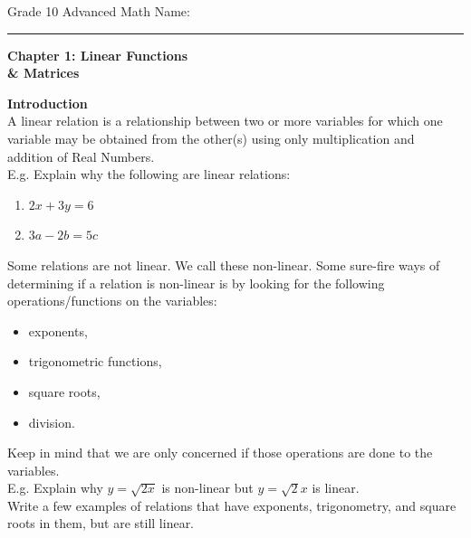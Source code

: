 \documentclass[12pt,fleqn]{book}
\begin{document}
\noindent
\thispagestyle{empty}
Grade 10 Advanced Math \hfill Name: \hspace{2in}
\medskip\hrule
\noindent

\vfill

\begin{center}
	{\bf \huge Chapter 1: Linear Functions \\ \& Matrices}
\end{center}

\vfill
\vfill

\clearpage

\setcounter{page}{1}

{\bf \huge Introduction }
\\[2em]
A linear relation is a relationship between two or more variables for which one variable may be obtained from the other(s) using only multiplication and addition of Real Numbers.
\\[1em]
E.g. Explain why the following are linear relations:
\begin{enumerate}
	\item $2x+3y = 6$
	\vspace{1in}
	\item $3a-2b = 5c$
	\vspace{1in}
\end{enumerate}
Some relations are not linear.  We call these non-linear.  Some sure-fire ways of determining if a relation is non-linear is by looking for the following operations/functions on the variables:
\begin{itemize}
	\item exponents,
	\item trigonometric functions,
	\item square roots,
	\item division.
\end{itemize}
Keep in mind that we are only concerned if those operations are done to the variables.
\\[1em]
E.g. Explain why $y=\sqrt{2x}$ is non-linear but $y=\sqrt 2 x$ is linear.
\\[1in]
Write a few examples of relations that have exponents, trigonometry, and square roots in them, but are still linear.
\end{document}
